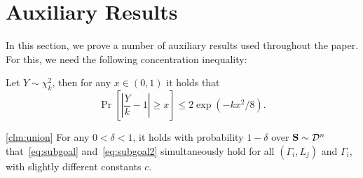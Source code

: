 \section{Auxiliary Results}
\label{sec:aux}
In this section, we prove a number of auxiliary results used throughout the paper. For this, we need the following concentration inequality:

\begin{theorem}
\label{thm:chibound}
Let $Y \sim \chi^2_k$, then for any $x \in (0,1)$ it holds that
\[
\Pr\left[\left|\frac{Y}{k} - 1\right| \ge x\right] \le 2\exp(-k x^2/8).
\]
\end{theorem}

\begin{customclm}{\ref{clm:union}}
    For any $0 < \delta < 1$, it holds with probability $1-\delta$ over $\mathbf{S} \sim \mathcal{D}^n$ that~\eqref{eq:subgoal} and~\eqref{eq:subgoal2} simultaneously hold for all $(\Gamma_i,L_j)$ and $\Gamma_i$, with slightly different constants $c$.
\end{customclm}
